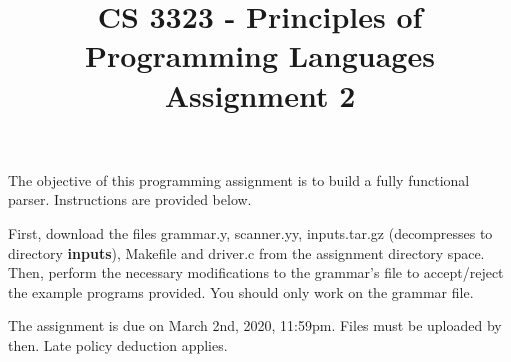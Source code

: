 \documentclass[letter,10pt]{article}
\title{CS 3323 - Principles of Programming Languages\\ Assignment 2}
\date{}
\begin{document}
\vspace{-1in}
\maketitle

The objective of this programming assignment is to build a fully functional parser. Instructions are provided below.

First, download the files 
grammar.y, scanner.yy, inputs.tar.gz (decompresses to directory {\bf inputs}), Makefile and driver.c from the assignment directory space. Then, perform the necessary modifications
to the grammar's file to accept/reject the example programs provided. You should only work on the grammar file.

The assignment is due on March 2nd, 2020, 11:59pm. Files must be uploaded by then. Late policy deduction applies.
\end{document}
